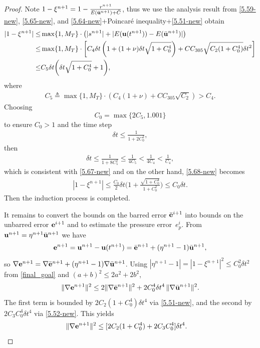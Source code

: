 \documentclass{article}
\theoremstyle{definition}                   %
\begin{document}
\begin{proof}
Note $1-\xi^{n+1}=1-\frac{r^{n+1}}{E(\bar{\bf u}^{n+1})+\bar{C}}$, thus we use the analysis result from \eqref{5.59-new}, \eqref{5.65-new}, and \eqref{5.64-new}+Poincar\'{e} inequality+\eqref{5.51-new} obtain
\begin{align}
|1-\xi^{n+1}| \le &
\max\{1,M_T\}\cdot \left( |s^{n+1}| + 
|E({\bf u}(t^{n+1})) - E(\bar{\bf u}^{n+1})| \right)
\notag\\
\le& \max\{1,M_T\}\cdot 
\left[
C_4\delta t \left(
1+ (1+\nu)\delta t \sqrt{1+C_0^4}  \right)
+
C C_{305} \sqrt{C_2(1+C_0^4)} \delta t^2
\right]
\notag\\
\le & C_5 \delta t \bigg(
\delta t\sqrt{1+C^4_0} + 1
\bigg),
\label{5.68-new}
\end{align}
where 
\begin{align}
C_5 \triangleq \max\{1, M_T\}
\cdot (C_4(1+\nu) + C C_{305} \sqrt{C_2} ) > C_4.
\end{align}
%
Choosing 
\begin{equation}
C_0 = \max\{ 2C_5, 1.001\}
\label{def_C0}
\end{equation}
to ensure $C_0>1$ 
and the time step
\begin{align}
\delta t \le \frac{1}{1+2C_0^2},
\label{5.71-new}
\end{align}
then
\begin{align}
\delta t \le \frac{1}{1+8C_5^2}
\le \frac{1}{4C_5} <
\frac{1}{4C_4} < \frac{1}{C_4},
\end{align}
which is consistent with \eqref{5.67-new}
and on the other hand, \eqref{5.68-new} becomes
\begin{align}
|1-\xi^{n+1}|
\le \frac{C_0}{2} \delta t \bigg(
1 + \frac{\sqrt{1+C^4_0}}{1+C_0^2} \bigg)
\le C_0 \delta t.
\label{final_goal}
\end{align}
Then the induction process is completed.


It remains to convert the bounds on the barred error
$\bar{\bf e}^{i+1}$ into bounds on the unbarred error
${\bf e}^{i+1}$ and to estimate the pressure error~$e^i_p$.
%
From ${\bf u}^{n+1}=\eta^{n+1}\bar{\bf u}^{n+1}$ we have
\begin{equation}
{\bf e}^{n+1}={\bf u}^{n+1}-{\bf u}(t^{n+1})=\bar{\bf e}^{n+1}+(\eta^{n+1}-1)\bar{\bf u}^{n+1},
\label{cat2123}
\end{equation}
so
$\nabla{\bf e}^{n+1}=\nabla\bar{\bf e}^{n+1}+(\eta^{n+1}-1)\nabla\bar{\bf u}^{n+1}$.
Using $|\eta^{n+1}-1|=|1-\xi^{n+1}|^2\le C_0^2\delta t^2$ from
\eqref{final_goal} and $(a+b)^2\le 2a^2+2b^2$,
\[
\|\nabla{\bf e}^{n+1}\|^2
\le 2\|\nabla\bar{\bf e}^{n+1}\|^2 + 2C_0^4\delta t^4\,\|\nabla\bar{\bf u}^{n+1}\|^2.
\]
The first term is bounded by $2C_2(1+C_0^4)\delta t^4$ via
\eqref{5.51-new}, and the second by $2C_3C_0^4\delta t^4$ via
\eqref{5.52-new}. This yields
\begin{align}
\| \nabla {\bf e}^{n+1}\|^2 &\le
 [2C_2 (1+C_0^4) + 2C_3 C_0^4 ]\delta t^4.
\label{5.74-new}
\end{align}


\end{proof}
\end{document}

